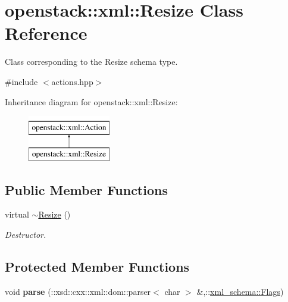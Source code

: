 \hypertarget{classopenstack_1_1xml_1_1Resize}{
\section{openstack::xml::Resize Class Reference}
\label{classopenstack_1_1xml_1_1Resize}
}


Class corresponding to the Resize schema type.  




{\ttfamily \#include $<$actions.hpp$>$}

Inheritance diagram for openstack::xml::Resize:\begin{figure}[H]
\begin{center}
\leavevmode
\includegraphics[height=2.000000cm]{classopenstack_1_1xml_1_1Resize}
\end{center}
\end{figure}
\subsection*{Public Member Functions}
\begin{DoxyCompactItemize}
\item 
\hypertarget{classopenstack_1_1xml_1_1Resize_a26df24d388d90646a8ccf6f8b257e9e2}{
virtual \hyperlink{classopenstack_1_1xml_1_1Resize_a26df24d388d90646a8ccf6f8b257e9e2}{$\sim$Resize} ()}
\label{classopenstack_1_1xml_1_1Resize_a26df24d388d90646a8ccf6f8b257e9e2}

\begin{DoxyCompactList}\small\item\em Destructor. \item\end{DoxyCompactList}\end{DoxyCompactItemize}
\subsection*{Protected Member Functions}
\begin{DoxyCompactItemize}
\item 
\hypertarget{classopenstack_1_1xml_1_1Resize_ad3444e648b84a2db37ab2abeb54302f2}{
void {\bfseries parse} (::xsd::cxx::xml::dom::parser$<$ char $>$ \&,::\hyperlink{namespacexml__schema_affb4c227cbd9aa7453dd1dc5a1401943}{xml\_\-schema::Flags})}
\label{classopenstack_1_1xml_1_1Resize_ad3444e648b84a2db37ab2abeb54302f2}

\end{DoxyCompactItemize}
